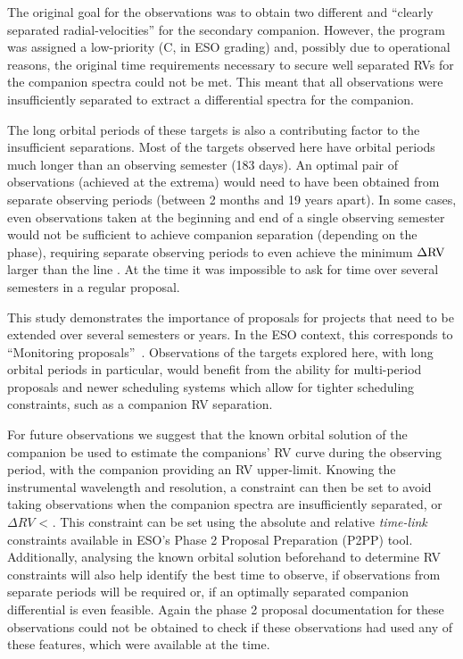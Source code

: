 The original goal for the observations was to obtain two different and ``clearly separated radial-velocities'' for the secondary companion.
However, the program was assigned a low-priority (C, in {ESO} grading) and, possibly due to operational reasons, the original time requirements necessary to secure well separated RVs for the companion spectra could not be met.
This meant that all observations were insufficiently separated to extract a differential spectra for the companion.

The long orbital periods of these targets is also a contributing factor to the insufficient separations.
Most of the targets observed here have orbital periods much longer than an observing semester (183 days).
An optimal pair of observations (achieved at the extrema) would need to have been obtained from separate observing periods (between 2 months and 19 years apart).
In some cases, even observations taken at the beginning and end of a single observing semester would not be sufficient to achieve companion separation (depending on the phase), requiring separate observing periods to even achieve the minimum \(\Delta \rm {RV}\) larger than the line {\fwhm}.
At the time it was impossible to ask for time over several semesters in a regular proposal.

This study demonstrates the importance of proposals for projects that need to be extended over several semesters or years.
In the {ESO} context, this corresponds to ``Monitoring proposals''~\citep[e.g.][pg.~18]{eso_eso_2017}.
Observations of the targets explored here, with long orbital periods in particular, would benefit from the ability for multi-period proposals and newer scheduling systems which allow for tighter scheduling constraints, such as a companion {RV} separation.

For future observations we suggest that the known orbital solution of the companion be used to estimate the companions' {RV} curve during the observing period, with the companion \Mtwosini{} providing an {RV} upper-limit.
Knowing the instrumental wavelength and resolution, a constraint can then be set to avoid taking observations when the companion spectra are insufficiently separated, or \(\Delta {RV}\) < {\fwhm}.
This constraint can be set using the absolute and relative \emph{time-link} constraints available in {ESO}'s {Phase 2 Proposal Preparation} (P2PP) tool.
Additionally, analysing the known orbital solution beforehand to determine {RV} constraints will also help identify the best time to observe, if observations from separate periods will be required or, if an optimally separated companion differential is even feasible.
Again the phase 2 proposal documentation for these observations could not be obtained to check if these observations had used any of these features, which were available at the time.





